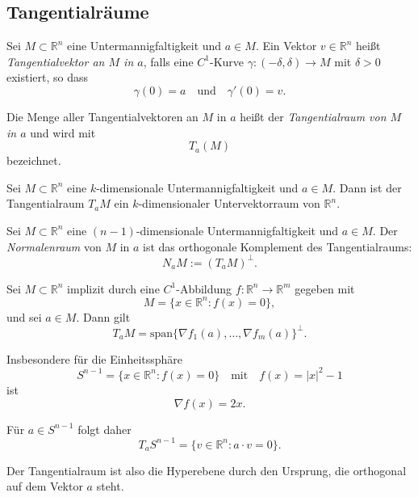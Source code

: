 \documentclass[11pt, a4paper]{article}
\begin{document}
\vspace{0.3cm} \par \subsection{Tangentialräume}
\begin{definition}
 Sei $M \subset \mathbb{R}^n$ eine Untermannigfaltigkeit und $a \in M$. Ein Vektor $v \in \mathbb{R}^n$ heißt \emph{Tangentialvektor an $M$ in $a$}, 
falls eine $C^1$-Kurve $\gamma : (-\delta,\delta) \to M$ mit $\delta > 0$ existiert, so dass
\[
\gamma(0) = a 
\quad \text{und} \quad 
\gamma'(0) = v.
\]

Die Menge aller Tangentialvektoren an $M$ in $a$ heißt der 
\emph{Tangentialraum von $M$ in $a$} und wird mit
\[
T_a (M)
\]
bezeichnet.
\end{definition}

\begin{theorem}

Sei $M \subset \mathbb{R}^n$ eine $k$-dimensionale Untermannigfaltigkeit 
und $a \in M$. Dann ist der Tangentialraum $T_a M$ ein 
$k$-dimensionaler Untervektorraum von $\mathbb{R}^n$.
\end{theorem}

\begin{definition}

Sei $M \subset \mathbb{R}^n$ eine $(n-1)$-dimensionale Untermannigfaltigkeit 
und $a \in M$. Der \emph{Normalenraum} von $M$ in $a$ ist das orthogonale Komplement des Tangentialraums:
\[
N_a M := (T_a M)^\perp.
\]
\end{definition}




\begin{example}

Sei $M \subset \mathbb{R}^n$ implizit durch eine $C^1$-Abbildung 
$f : \mathbb{R}^n \to \mathbb{R}^m$ gegeben mit
\[
M = \{x \in \mathbb{R}^n : f(x) = 0\},
\]
und sei $a \in M$. Dann gilt
\[
T_a M 
=
\mathrm{span}\{\nabla f_1(a), \dots, \nabla f_m(a)\}^\perp.
\]

Insbesondere für die Einheitssphäre
\[
S^{n-1}
=
\{x \in \mathbb{R}^n : f(x) = 0\}
\quad \text{mit} \quad
f(x) = |x|^2 - 1
\]
ist
\[
\nabla f(x) = 2x.
\]

Für $a \in S^{n-1}$ folgt daher
\[
T_a S^{n-1}
=
\{ v \in \mathbb{R}^n : a \cdot v = 0 \}.
\]

Der Tangentialraum ist also die Hyperebene durch den Ursprung, 
die orthogonal auf dem Vektor $a$ steht.
\end{example}
\end{document}
